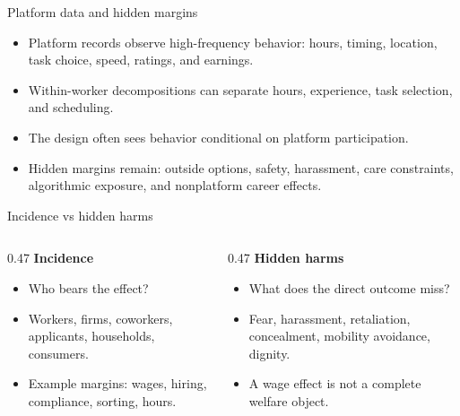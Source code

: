 \documentclass[aspectratio=169,11pt]{beamer}
\begin{document}
\begin{frame}{Platform data and hidden margins}
\begin{itemize}
    \item Platform records observe high-frequency behavior: hours, timing, location, task choice, speed, ratings, and earnings.
    \item Within-worker decompositions can separate hours, experience, task selection, and scheduling.
    \item The design often sees behavior conditional on platform participation.
    \item Hidden margins remain: outside options, safety, harassment, care constraints, algorithmic exposure, and nonplatform career effects.
\end{itemize}
\end{frame}

\begin{frame}{Incidence vs hidden harms}
\begin{columns}[T,onlytextwidth]
\begin{column}{0.47\linewidth}
\textbf{Incidence}
\begin{itemize}
    \item Who bears the effect?
    \item Workers, firms, coworkers, applicants, households, consumers.
    \item Example margins: wages, hiring, compliance, sorting, hours.
\end{itemize}
\end{column}
\begin{column}{0.47\linewidth}
\textbf{Hidden harms}
\begin{itemize}
    \item What does the direct outcome miss?
    \item Fear, harassment, retaliation, concealment, mobility avoidance, dignity.
    \item A wage effect is not a complete welfare object.
\end{itemize}
\end{column}
\end{columns}
\end{frame}
\end{document}
